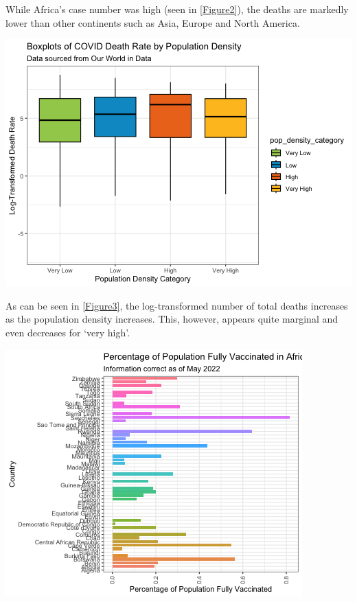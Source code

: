 \documentclass[11pt,preprint, authoryear]{elsarticle}
\let\origfigure\figure
\let\endorigfigure\endfigure
\renewenvironment{figure}[1][2] {
    \expandafter\origfigure\expandafter[H]
} {
    \endorigfigure
}
\numberwithin{equation}{section}
\numberwithin{figure}{section}
\numberwithin{table}{section}
\begin{document}
While Africa's case number was high (seen in \ref{Figure2}), the deaths
are markedly lower than other continents such as Asia, Europe and North
America.

\begin{figure}[H]

{\centering \includegraphics{q1_files/figure-latex/Figure3-1} 

}

\caption{Box Plot of Deaths by Population Density \label{Figure2}}\label{fig:Figure3}
\end{figure}

As can be seen in \ref{Figure3}, the log-transformed number of total
deaths increases as the population density increases. This, however,
appears quite marginal and even decreases for `very high'.

\begin{figure}[H]

{\centering \includegraphics{q1_files/figure-latex/Figure4-1} 

}

\caption{Total Percentage of Population Vaccinated in African Countries as of May 2022\label{Figure4}}\label{fig:Figure4}
\end{figure}
\end{document}
